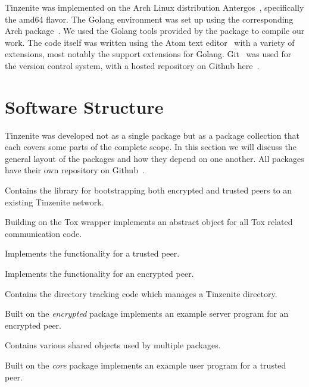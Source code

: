 Tinzenite was implemented on the Arch Linux distribution Antergos~\cite{web:site:antergos}, specifically the amd64 flavor.
The Golang environment was set up using the corresponding Arch package~\cite{web:site:arch_go}.
We used the Golang tools provided by the package to compile our work.
The code itself was written using the Atom text editor~\cite{web:site:atom} with a variety of extensions, most notably the support extensions for Golang.
Git~\cite{web:site:git} was used for the version control system, with a hosted repository on Github here~\cite{web:site:github:tinzenite}.

\section{Software Structure}
\label{sec:Software Structure}

Tinzenite was developed not as a single package but as a package collection that each covers some parts of the complete scope.
In this section we will discuss the general layout of the packages and how they depend on one another.
All packages have their own repository on Github~\cite{web:site:github:tinzenite}.

\begin{description}[leftmargin=6em,style=nextline,noitemsep,nolistsep]
    \item[bootstrap]
        Contains the library for bootstrapping both encrypted and trusted peers to an existing Tinzenite network.
    \item[channel]
        Building on the Tox wrapper implements an abstract object for all Tox related communication code.
    \item[core]
        Implements the functionality for a trusted peer.
    \item[encrypted]
        Implements the functionality for an encrypted peer.
    \item[model]
        Contains the directory tracking code which manages a Tinzenite directory.
    \item[server]
        Built on the \emph{encrypted} package implements an example server program for an encrypted peer.
    \item[shared]
        Contains various shared objects used by multiple packages.
    \item[tin]
        Built on the \emph{core} package implements an example user program for a trusted peer.
\end{description}

